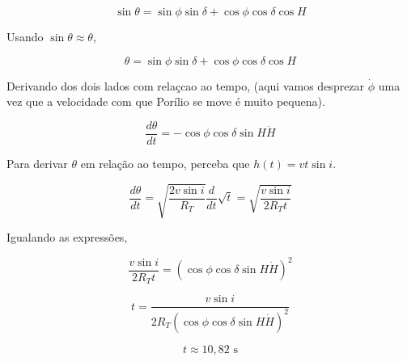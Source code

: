 \documentclass[11pt]{article}
\begin{document}
\begin{pproblem}
\begin{pssolution*}{}{}
\begin{alternativas}
            \[\sin\theta = \sin\phi\sin\delta + \cos\phi\cos\delta\cos H\]

            Usando \(\sin\theta\approx \theta\), 

            \[\theta = \sin\phi\sin\delta+\cos\phi\cos\delta \cos H\]

            Derivando dos dois lados com relaçcao ao tempo, (aqui vamos desprezar \(\dot{\phi}\) uma vez que a velocidade com que Porílio se move é muito pequena).

            \[\frac{d\theta}{dt} = -\cos\phi\cos\delta\sin H \dot{H}\]

            Para derivar \(\theta\) em relação ao tempo, perceba que \(h(t) = v t \sin i\).

            \[\frac{d\theta}{dt} = \sqrt{\frac{2v\sin i }{R_T}}\frac{d}{dt}\sqrt{t} = \sqrt{\frac{v\sin i}{2 R_T t}}\]

            Igualando as expressões, 

            \[\frac{v\sin i}{2R_T t} = (\cos\phi\cos\delta\sin H \dot{H})^2\]

            \[t = \frac{v\sin i}{2R_T(\cos\phi\cos\delta\sin H \dot{H})^2}\]

            \[\boxed{t \approx 10,82\text{ s}}\]

        \end{alternativas}
    
\end{pssolution*}
\end{pproblem}
\end{document}
